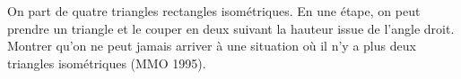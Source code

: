 On part de quatre triangles rectangles isométriques. En une étape, on peut prendre un triangle et le couper en deux suivant la hauteur issue de l'angle droit. Montrer qu'on ne peut jamais arriver à une situation où il n'y a plus deux triangles isométriques (MMO 1995).
